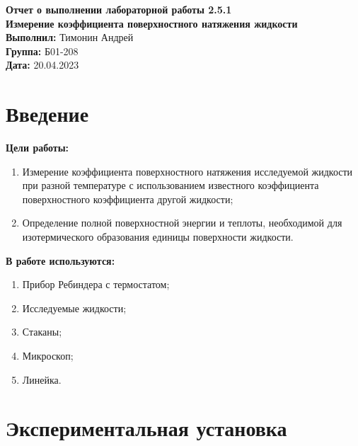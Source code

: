 \documentclass[a4paper, 12pt]{article}
\begin{document}
	\begin{Huge}
		\begin{center}
			\textbf{Отчет о выполнении лабораторной работы 2.5.1}\\
			\vspace{2em}
			\textbf{Измерение коэффициента поверхностного натяжения жидкости}\\
			\vspace{5em}
			\textbf{Выполнил: }Тимонин Андрей\\
			\textbf{Группа: }Б01-208\\
			\vspace{9em}
			\textbf{Дата: }20.04.2023\\
		\end{center}
	\end{Huge}
	
	\section{Введение}
	\noindent\textbf{Цели работы:}
		\begin{enumerate}
			\item Измерение коэффициента поверхностного натяжения исследуемой жидкости при разной температуре с использованием известного коэффициента поверхностного коэффициента другой жидкости;
			\item Определение полной поверхностной энергии и теплоты, необходимой для изотермического образования единицы поверхности жидкости.
		\end{enumerate}
	\bigskip
	
	\noindent\textbf{В работе используются:}
		\begin{enumerate}
			\item Прибор Ребиндера с термостатом;
			\item Исследуемые жидкости;
			\item Стаканы;
			\item Микроскоп;
			\item Линейка.
		\end{enumerate}
	\section{Экспериментальная установка}
\end{document}
